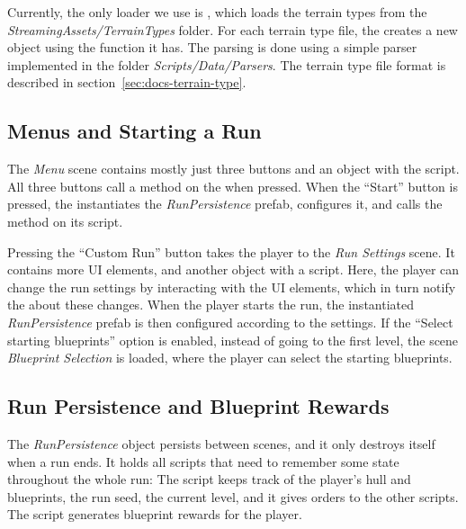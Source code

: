 Currently, the only loader we use is , which loads the terrain types from the \emph{StreamingAssets/TerrainTypes} folder.
For each terrain type file, the  creates a new  object using the function  it has.
The parsing is done using a simple parser implemented in the folder \emph{Scripts/Data/Parsers}.
The terrain type file format is described in section~\ref{sec:docs-terrain-type}.

\subsection{Menus and Starting a Run}

The \emph{Menu} scene contains mostly just three buttons and an object with the  script.
All three buttons call a method on the  when pressed.
When the \enquote{Start} button is pressed, the  instantiates the \emph{RunPersistence} prefab, configures it, and calls the  method on its  script.

Pressing the \enquote{Custom Run} button takes the player to the \emph{Run Settings} scene.
It contains more UI elements, and another object with a  script.
Here, the player can change the run settings by interacting with the UI elements, which in turn notify the  about these changes.
When the player starts the run, the instantiated \emph{RunPersistence} prefab is then configured according to the settings.
If the \enquote{Select starting blueprints} option is enabled, instead of going to the first level, the scene \emph{Blueprint Selection} is loaded, where the player can select the starting blueprints.

\subsection{Run Persistence and Blueprint Rewards}\label{sec:docs-run-persistence}

The \emph{RunPersistence} object persists between scenes, and it only destroys itself when a run ends.
It holds all scripts that need to remember some state throughout the whole run:
The  script keeps track of the player's hull and blueprints, the run seed, the current level, and it gives orders to the other scripts.
The  script generates blueprint rewards for the player.

